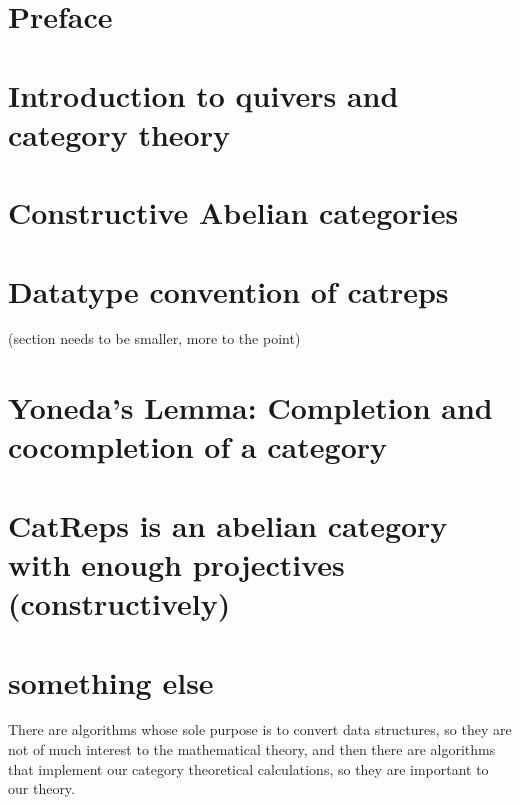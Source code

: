 \documentclass{article}
\begin{document}
\tableofcontents\label{toc}
\section{Preface}

\section{Introduction to quivers and category theory}



\section{Constructive Abelian categories}


\section{Datatype convention of catreps}
(section needs to be smaller, more to the point)
%

\section{Yoneda's Lemma: Completion and cocompletion of a category}


\section{CatReps is an abelian category with enough projectives (constructively)}



\section{something else}
There are algorithms whose sole purpose is to convert data structures, so they are not of much interest to the mathematical theory,
and then there are algorithms that implement our category theoretical calculations, so they are important to our theory.
\end{document}
